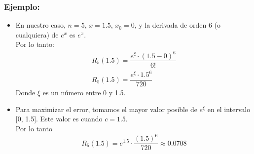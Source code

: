 \documentclass{beamer}
\begin{document}
\begin{frame}
\frametitle{Ejemplo:}
 \begin{itemize}
   \item<1-> En nuestro caso, $n = 5$, $x = 1.5$, $x_0 = 0$, y la derivada de orden 6 (o cualquiera) de $e^x$ es $e^x$.\\
   Por lo tanto:
   $$
   \begin{array}{l}
   R_5(1.5) = \dfrac{e^\xi \cdot (1.5 - 0)^6}{6!}\\[10pt]
   R_5(1.5) = \dfrac{e^\xi \cdot 1.5^6}{720} 
   \end{array}
   $$
   Donde $\xi$ es un n\'umero entre 0 y 1.5.
   \item<2-> Para maximizar el error, tomamos el mayor valor posible de $e^\xi$ en el intervalo [0, 1.5]. Este valor es cuando $c=1.5$.\\
Por lo tanto
$$
R_5(1.5) = e^{1.5} \cdot \dfrac{(1.5)^6}{720} \approx 0.0708
$$
 \end{itemize}
\end{frame}
\end{document}
